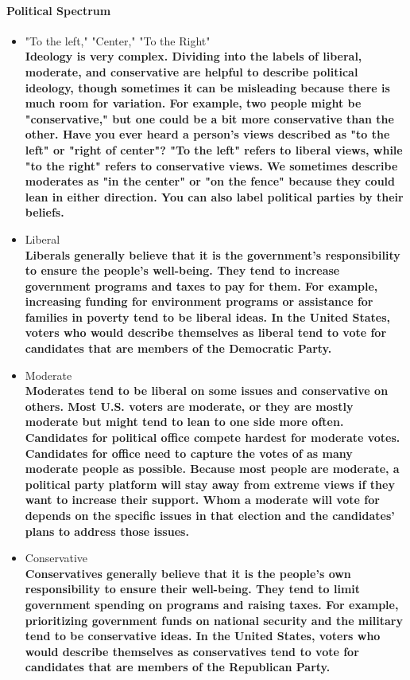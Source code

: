 \paragraph{Political Spectrum}

\begin{itemize}
    \item "To the left," "Center," "To the Right"   \\
        \bf{Ideology is very complex. Dividing into the labels of liberal, moderate, and conservative are helpful to describe political ideology, though sometimes it can be misleading because there is much room for variation. For example, two people might be "conservative," but one could be a bit more conservative than the other. Have you ever heard a person's views described as "to the left" or "right of center"? "To the left" refers to liberal views, while "to the right" refers to conservative views. We sometimes describe moderates as "in the center" or "on the fence" because they could lean in either direction. You can also label political parties by their beliefs.}
    \item Liberal                                   \\
        \bf{Liberals generally believe that it is the government's responsibility to ensure the people's well-being. They tend to increase government programs and taxes to pay for them. For example, increasing funding for environment programs or assistance for families in poverty tend to be liberal ideas. In the United States, voters who would describe themselves as liberal tend to vote for candidates that are members of the Democratic Party.}
    \item Moderate                                  \\
        \bf{Moderates tend to be liberal on some issues and conservative on others. Most U.S. voters are moderate, or they are mostly moderate but might tend to lean to one side more often. Candidates for political office compete hardest for moderate votes. Candidates for office need to capture the votes of as many moderate people as possible. Because most people are moderate, a political party platform will stay away from extreme views if they want to increase their support. Whom a moderate will vote for depends on the specific issues in that election and the candidates' plans to address those issues.}
    \item Conservative                              \\
        \bf{Conservatives generally believe that it is the people's own responsibility to ensure their well-being. They tend to limit government spending on programs and raising taxes. For example, prioritizing government funds on national security and the military tend to be conservative ideas. In the United States, voters who would describe themselves as conservatives tend to vote for candidates that are members of the Republican Party.}

\end{itemize}
